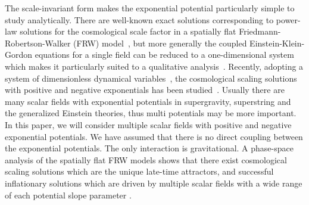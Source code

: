\documentclass[a4paper,12pt]{article}
\begin{document}
The scale-invariant form makes the exponential potential
particularly simple to study analytically. There are well-known
exact solutions corresponding to power-law solutions for the
cosmological scale factor \coordHE{} in a spatially flat
Friedmann-Robertson-Walker (FRW) model~\cite{FLM},
but more generally the coupled
Einstein-Klein-Gordon equations for a single field can be reduced
to a one-dimensional system which makes it particularly suited to
a qualitative analysis~\cite{JJH,CLW}. Recently, adopting a system
of dimensionless dynamical variables~\cite{EW},
the cosmological scaling solutions with positive and negative
exponentials has been studied~\cite{HW}. Usually there are many
scalar fields with exponential potentials in supergravity,
superstring and the generalized Einstein theories, thus multi
potentials may be more important.
In this paper, we will consider multiple scalar fields with
positive and negative exponential potentials. We have assumed that
there is no direct coupling between the exponential potentials.
The only interaction is gravitational. A phase-space analysis of
the spatially flat FRW models shows that there exist cosmological
scaling solutions which are the unique late-time attractors, and
successful inflationary solutions which are driven by multiple
scalar fields with a wide range of each potential slope parameter
\myHighlight{$\lambda$}\coordHE{}.
\end{document}
